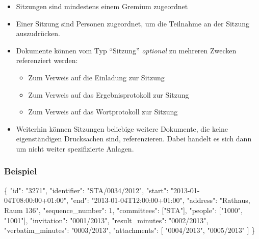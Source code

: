 \documentclass[,a4paper]{article}
\newenvironment{Shaded}{}{}
\newcommand{\DataTypeTok}[1]{\textcolor[rgb]{0.56,0.13,0.00}{{#1}}}
\newcommand{\DecValTok}[1]{\textcolor[rgb]{0.25,0.63,0.44}{{#1}}}
\newcommand{\StringTok}[1]{\textcolor[rgb]{0.25,0.44,0.63}{{#1}}}
\newcommand{\NormalTok}[1]{{#1}}
\begin{document}
\begin{itemize}
\item
  Sitzungen sind mindestens einem Gremium zugeordnet
\item
  Einer Sitzung sind Personen zugeordnet, um die Teilnahme an der
  Sitzung auszudrücken.
\item
  Dokumente können vom Typ ``Sitzung'' \emph{optional} zu mehreren
  Zwecken referenziert werden:

  \begin{itemize}
  \item
    Zum Verweis auf die Einladung zur Sitzung
  \item
    Zum Verweis auf das Ergebnisprotokoll zur Sitzung
  \item
    Zum Verweis auf das Wortprotokoll zur Sitzung
  \end{itemize}
\item
  Weiterhin können Sitzungen beliebige weitere Dokumente, die keine
  eigenständigen Drucksachen sind, referenzieren. Dabei handelt es sich
  dann um nicht weiter spezifizierte Anlagen.
\end{itemize}

\subsubsection{Beispiel}

\begin{Shaded}
\begin{Highlighting}[]
\NormalTok{\{}
    \DataTypeTok{"id"}\NormalTok{: }\StringTok{"3271"}\NormalTok{,}
    \DataTypeTok{"identifier"}\NormalTok{: }\StringTok{"STA/0034/2012"}\NormalTok{,}
    \DataTypeTok{"start"}\NormalTok{: }\StringTok{"2013-01-04T08:00:00+01:00"}\NormalTok{,}
    \DataTypeTok{"end"}\NormalTok{: }\StringTok{"2013-01-04T12:00:00+01:00"}\NormalTok{,}
    \DataTypeTok{"address"}\NormalTok{: }\StringTok{"Rathaus, Raum 136"}\NormalTok{,}
    \DataTypeTok{"sequence_number"}\NormalTok{: }\DecValTok{1}\NormalTok{,}
    \DataTypeTok{"committees"}\NormalTok{: [}\StringTok{"STA"}\NormalTok{],}
    \DataTypeTok{"people"}\NormalTok{: [}\StringTok{"1000"}\NormalTok{, }\StringTok{"1001"}\NormalTok{],}
    \DataTypeTok{"invitation"}\NormalTok{: }\StringTok{"0001/2013"}\NormalTok{,}
    \DataTypeTok{"result_minutes"}\NormalTok{: }\StringTok{"0002/2013"}\NormalTok{,}
    \DataTypeTok{"verbatim_minutes"}\NormalTok{: }\StringTok{"0003/2013"}\NormalTok{,}
    \DataTypeTok{"attachments"}\NormalTok{: [}
        \StringTok{"0004/2013"}\NormalTok{,}
        \StringTok{"0005/2013"}
    \NormalTok{]}
\NormalTok{\}}
\end{Highlighting}
\end{Shaded}
\end{document}
